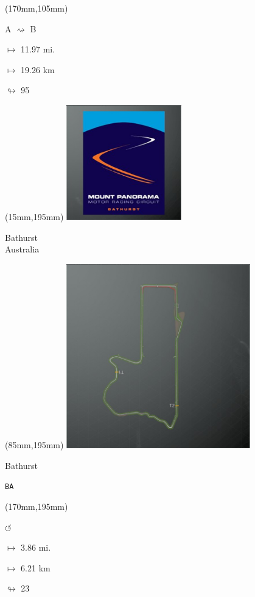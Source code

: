 \begin{textblock*}{30mm}(170mm,105mm)%
\par A $\rightsquigarrow$ B
\Large
\par$\mapsto$ 11.97 mi.
\par$\mapsto$ 19.26 km
\par$\looparrowright$ 95
\end{textblock*}
\begin{textblock*}{60mm}(15mm,195mm)%
\includegraphics[width=50mm]{LG/2015-05-20_00087.png}
\par Bathurst\\ Australia
\end{textblock*}
\begin{textblock*}{80mm}(85mm,195mm)%
\includegraphics[width=80mm]{TR/2015-05-20_00036.png}
\centerline{Bathurst}
\par\hfill\tiny\tt BA\\
\end{textblock*}
\begin{textblock*}{30mm}(170mm,195mm)%
\par \Huge$\circlearrowleft$
\Large
\par$\mapsto$ 3.86 mi.
\par$\mapsto$ 6.21 km
\par$\looparrowright$ 23
\end{textblock*}
\null\newpage

